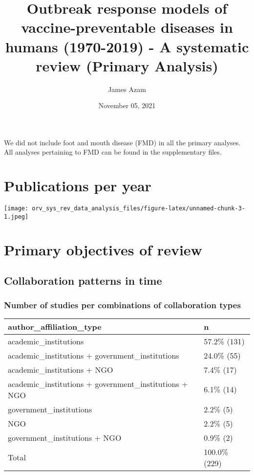 \documentclass[
]{article}
\title{Outbreak response models of vaccine-preventable diseases in
humans (1970-2019) - A systematic review (Primary Analysis)}
\author{James Azam}
\date{November 05, 2021}
\begin{document}
\maketitle

{
\setcounter{tocdepth}{2}
\tableofcontents
}
We did not include foot and mouth disease (FMD) in all the primary
analyses. All analyses pertaining to FMD can be found in the
supplementary files.

\hypertarget{publications-per-year}{%
\section{Publications per year}\label{publications-per-year}}

\texttt{[image: orv\_sys\_rev\_data\_analysis\_files/figure-latex/unnamed-chunk-3-1.jpeg]}

\hypertarget{primary-objectives-of-review}{%
\section{Primary objectives of
review}\label{primary-objectives-of-review}}

\hypertarget{collaboration-patterns-in-time}{%
\subsection{Collaboration patterns in
time}\label{collaboration-patterns-in-time}}

\hypertarget{number-of-studies-per-combinations-of-collaboration-types}{%
\subsubsection{Number of studies per combinations of collaboration
types}\label{number-of-studies-per-combinations-of-collaboration-types}}

\begin{longtable}[]{@{}ll@{}}
\toprule
author\_affiliation\_type & n \\
\midrule
\endhead
academic\_institutions & 57.2\% (131) \\
academic\_institutions + government\_institutions & 24.0\% (55) \\
academic\_institutions + NGO & 7.4\% (17) \\
academic\_institutions + government\_institutions + NGO & 6.1\% (14) \\
government\_institutions & 2.2\% (5) \\
NGO & 2.2\% (5) \\
government\_institutions + NGO & 0.9\% (2) \\
Total & 100.0\% (229) \\
\bottomrule
\end{longtable}
\end{document}
